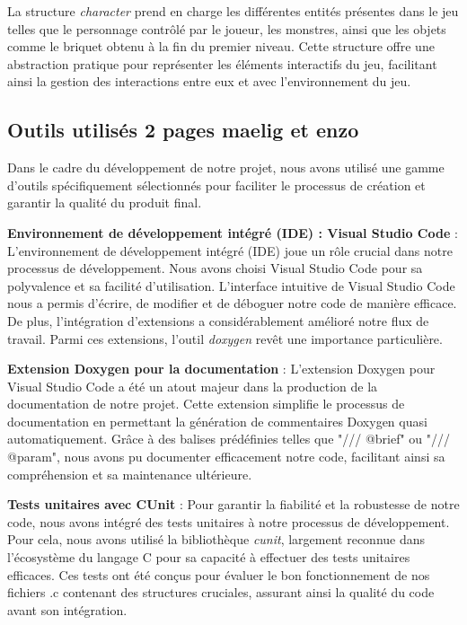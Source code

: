 \documentclass[10pt]{article}
\begin{document}
La structure \textit{\gls{character}} prend en charge les différentes entités présentes dans le jeu telles que le personnage contrôlé par le joueur, les monstres, ainsi que les objets comme le briquet obtenu à la fin du premier niveau. Cette structure offre une abstraction pratique pour représenter les éléments interactifs du jeu, facilitant ainsi la gestion des interactions entre eux et avec l'environnement du jeu.


\subsection{Outils utilisés 2 pages maelig et enzo}
Dans le cadre du développement de notre projet, nous avons utilisé une gamme d'outils spécifiquement sélectionnés pour faciliter le processus de création et garantir la qualité du produit final.

\textbf{Environnement de développement intégré (IDE) : Visual Studio Code} :
L'environnement de développement intégré (IDE) joue un rôle crucial dans notre processus de développement. Nous avons choisi Visual Studio Code pour sa polyvalence et sa facilité d'utilisation. L'interface intuitive de Visual Studio Code nous a permis d'écrire, de modifier et de déboguer notre code de manière efficace. De plus, l'intégration d'extensions a considérablement amélioré notre flux de travail. Parmi ces extensions, l'outil \textit{\gls{doxygen}} revêt une importance particulière.

\textbf{Extension Doxygen pour la documentation} :
L'extension Doxygen pour Visual Studio Code a été un atout majeur dans la production de la documentation de notre projet. Cette extension simplifie le processus de documentation en permettant la génération de commentaires Doxygen quasi automatiquement. Grâce à des balises prédéfinies telles que "/// @brief" ou "/// @param", nous avons pu documenter efficacement notre code, facilitant ainsi sa compréhension et sa maintenance ultérieure.

\textbf{Tests unitaires avec CUnit} :
Pour garantir la fiabilité et la robustesse de notre code, nous avons intégré des tests unitaires à notre processus de développement. Pour cela, nous avons utilisé la bibliothèque \textit{\gls{cunit}}, largement reconnue dans l'écosystème du langage C pour sa capacité à effectuer des tests unitaires efficaces. Ces tests ont été conçus pour évaluer le bon fonctionnement de nos fichiers .c contenant des structures cruciales, assurant ainsi la qualité du code avant son intégration.
\end{document}

